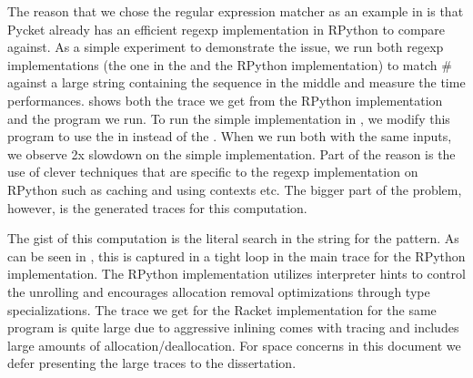 The reason that we chose the regular expression matcher as an example
in  is that Pycket already has an efficient regexp
implementation in RPython to compare against. As a simple experiment
to demonstrate the issue, we run both regexp implementations (the one
in the  and the RPython implementation) to match
$\mathtt{\#}$ against a large string containing
the sequence  in the middle and measure the time
performances.  shows both the trace we get
from the RPython implementation and the program we run. To run the
simple implementation in , we modify this program
to use the  in instead of the
. When we run both with the same inputs, we
observe 2x slowdown on the simple implementation. Part of the reason
is the use of clever techniques that are specific to the regexp
implementation on RPython such as caching and using contexts etc. The
bigger part of the problem, however, is the generated traces for this
computation.

The gist of this computation is the literal search in the string for
the  pattern. As can be seen in
, this is captured in a tight loop in the
main trace for the RPython implementation. The RPython implementation
utilizes interpreter hints to control the unrolling and encourages
allocation removal optimizations through type specializations. The
trace we get for the Racket implementation for the same program is
quite large due to aggressive inlining comes with tracing and includes
large amounts of allocation/deallocation. For space concerns in this
document we defer presenting the large traces to the dissertation.



